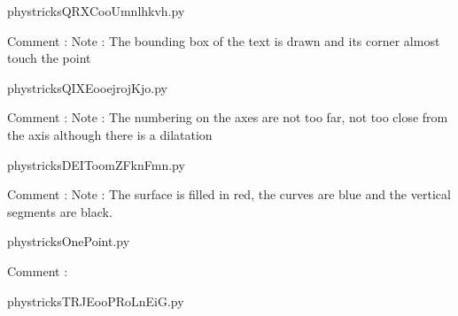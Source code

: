     \newcommand{\CaptionFigQRXCooUmnlhkvh}{<+Type your caption here+>}
    \begin{center}
        
    \end{center}
    phystricksQRXCooUmnlhkvh.py

    Comment : Note : The bounding box of the text is drawn and its corner almost touch the point

    \clearpage
    


    \newcommand{\CaptionFigQIXEooejrojKjo}{<+Type your caption here+>}
    \begin{center}
        
    \end{center}
    phystricksQIXEooejrojKjo.py

    Comment : Note : The numbering on the axes are not too far, not too close from the axis although there is a dilatation

    \clearpage
    


    \newcommand{\CaptionFigDEIToomZFknFmn}{<+Type your caption here+>}
    \begin{center}
        
    \end{center}
    phystricksDEIToomZFknFmn.py

    Comment : Note : The surface is filled in red, the curves are blue and the vertical segments are black.

    \clearpage
    


    \newcommand{\CaptionFigOnePoint}{<+Type your caption here+>}
    \begin{center}
        
    \end{center}
    phystricksOnePoint.py

    Comment : 

    \clearpage
    


    \newcommand{\CaptionFigTRJEooPRoLnEiG}{<+Type your caption here+>}
    \begin{center}
        
    \end{center}
    phystricksTRJEooPRoLnEiG.py


